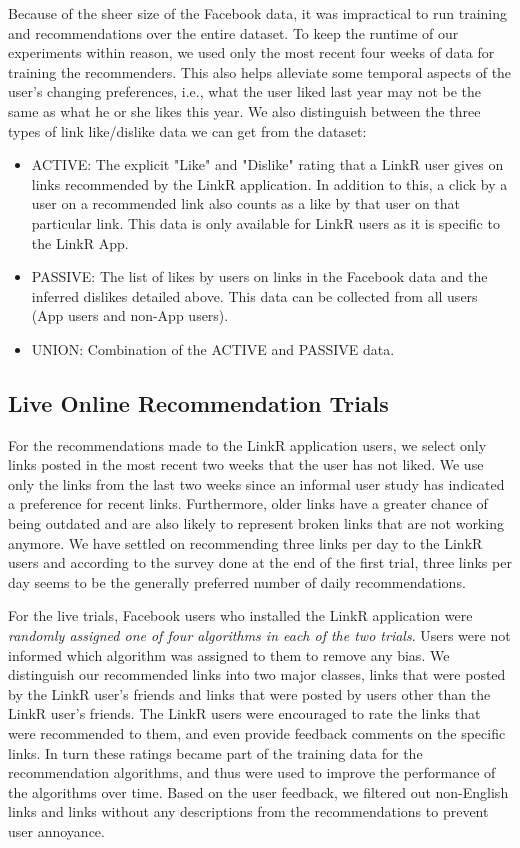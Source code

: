 Because of the sheer size of the Facebook data, it was impractical to
run training and recommendations over the entire dataset. To keep the
runtime of our experiments within reason, we used only the most recent
four weeks of data for training the recommenders. This also helps
alleviate some temporal aspects of the user's changing preferences,
i.e., what the user liked last year may not be the same as what he or
she likes this year. We also distinguish between the three types of
link like/dislike data we can get from the dataset:

\begin{itemize}
\item {ACTIVE: The explicit "Like" and "Dislike" rating that a LinkR
user gives on links recommended by the LinkR application. In addition
to this, a click by a user on a recommended link also counts as a like
by that user on that particular link.  This data is only available for
LinkR users as it is specific to the LinkR App.}
\item {PASSIVE: The list of likes by users on links in the Facebook data and the inferred dislikes detailed above.  This data can be collected from all users (App users and non-App users).}
\item{UNION: Combination of the ACTIVE and PASSIVE data.}
\end{itemize}

\subsection{Live Online Recommendation Trials}

For the recommendations made to the LinkR application users, we select
only links posted in the most recent two weeks that the user has not
liked. We use only the links from the last two weeks since an informal
user study has indicated a preference for recent links.  Furthermore,
older links have a greater chance of being outdated and are also
likely to represent broken links that are not working anymore. We have
settled on recommending three links per day to the LinkR users and
according to the survey done at the end of the first trial, three
links per day seems to be the generally preferred number of
daily recommendations.

For the live trials, Facebook users who installed the LinkR
application were \emph{randomly assigned one of four algorithms in
each of the two trials}. Users were not informed which algorithm was
assigned to them to remove any bias. We distinguish our recommended
links into two major classes, links that were posted by the LinkR
user's friends and links that were posted by users other than the
LinkR user's friends. The LinkR users were encouraged to rate the
links that were recommended to them, and even provide feedback
comments on the specific links. In turn these ratings became part of
the training data for the recommendation algorithms, and thus were used
to improve the performance of the algorithms over time. Based on the
user feedback, we filtered out non-English links and links without any
descriptions from the recommendations to prevent user annoyance.

